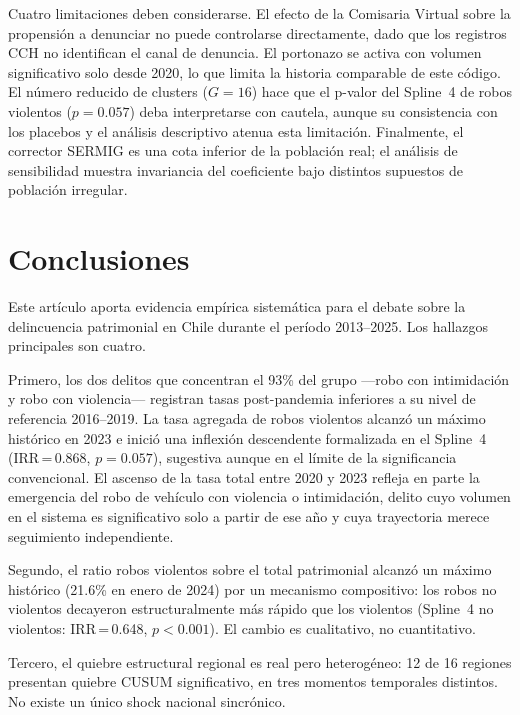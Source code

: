 \documentclass[12pt,a4paper]{article}
\begin{document}
Cuatro limitaciones deben considerarse. El efecto de la Comisaria Virtual sobre la
propensi\'on a denunciar no puede controlarse directamente, dado que los registros CCH
no identifican el canal de denuncia. El portonazo se activa con volumen significativo
solo desde 2020, lo que limita la historia comparable de este c\'odigo. El n\'umero
reducido de clusters ($G=16$) hace que el p-valor del Spline~4 de robos violentos
($p=0.057$) deba interpretarse con cautela, aunque su consistencia con los placebos
y el an\'alisis descriptivo atenua esta limitaci\'on. Finalmente, el corrector SERMIG
es una cota inferior de la poblaci\'on real; el an\'alisis de sensibilidad muestra
invariancia del coeficiente bajo distintos supuestos de poblaci\'on irregular.


\section{Conclusiones}
\label{sec:conclusiones}

Este art\'iculo aporta evidencia emp\'irica sistem\'atica para el debate sobre la
delincuencia patrimonial en Chile durante el per\'iodo 2013--2025. Los hallazgos
principales son cuatro.

Primero, los dos delitos que concentran el 93\% del grupo ---robo con intimidaci\'on
y robo con violencia--- registran tasas post-pandemia inferiores a su nivel de
referencia 2016--2019. La tasa agregada de robos violentos alcanz\'o un m\'aximo
hist\'orico en 2023 e inici\'o una inflexi\'on descendente formalizada en el Spline~4
(IRR\,=\,0.868, $p=0.057$), sugestiva aunque en el l\'imite de la significancia
convencional. El ascenso de la tasa total entre 2020 y 2023 refleja en parte la
emergencia del robo de veh\'iculo con violencia o intimidaci\'on, delito cuyo volumen
en el sistema es significativo solo a partir de ese a\~no y cuya trayectoria merece
seguimiento independiente.

Segundo, el ratio robos violentos sobre el total patrimonial alcanz\'o un m\'aximo
hist\'orico (21.6\% en enero de 2024) por un mecanismo compositivo: los robos no
violentos decayeron estructuralmente m\'as r\'apido que los violentos (Spline~4 no
violentos: IRR\,=\,0.648, $p<0.001$). El cambio es cualitativo, no cuantitativo.

Tercero, el quiebre estructural regional es real pero heterog\'eneo: 12 de 16 regiones
presentan quiebre CUSUM significativo, en tres momentos temporales distintos. No existe
un \'unico shock nacional sincr\'onico.
\end{document}
